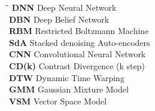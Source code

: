 \abbreviations
 
\noindent 
\begin{tabbing}
\hspace*{4cm}\=\hspace*{6cm}\= \kill
\textbf{DNN}   \> Deep Neural Network \\
\textbf{DBN}   \> Deep Belief Network \\
\textbf{RBM}   \> Restricted Boltzmann Machine\\
\textbf{SdA}   \> Stacked denoising Auto-encoders\\
\textbf{CNN}   \> Convolutional Neural Network \\
\textbf{CD(k)} \> Contrast Divergence (k step)\\
\textbf{DTW}   \> Dynamic Time Warping \\
\textbf{GMM}   \> Gaussian Mixture Model\\
\textbf{VSM}   \> Vector Space Model\\

\end{tabbing}

\pagebreak

